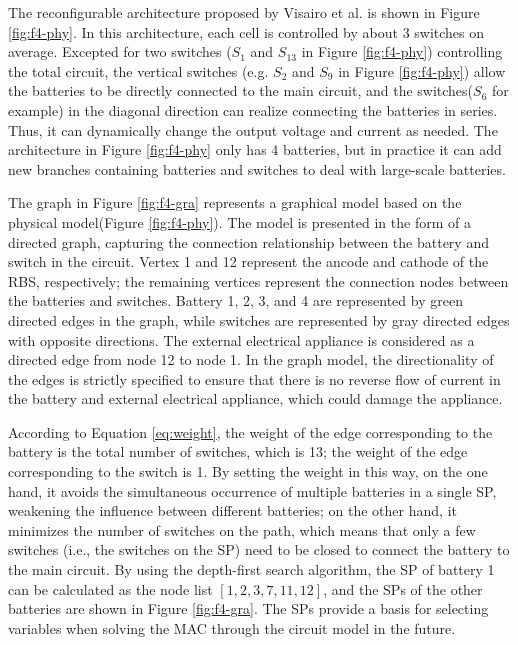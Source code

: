 \documentclass{article}
\begin{document}
The reconfigurable architecture proposed by Visairo et al.\cite{visairoReconfigurableBatteryPack2008} is shown in Figure \ref{fig:f4-phy}.
In this architecture, each cell is controlled by about 3 switches on average.
Excepted for two switches ($S_1$ and $S_{13}$ in Figure \ref{fig:f4-phy}) controlling the total circuit, the vertical switches (e.g. $S_2$ and $S_9$ in Figure \ref{fig:f4-phy}) allow the batteries to be directly connected to the main circuit, and the switches($S_6$ for example) in the diagonal direction can realize connecting the batteries in series.
Thus, it can dynamically change the output voltage and current as needed.
The architecture in Figure \ref{fig:f4-phy} only has 4 batteries, but in practice it can add new branches containing batteries and switches to deal with large-scale batteries\cite{kimDependableEfficientScalable2010}.


The graph in Figure \ref{fig:f4-gra} represents a graphical model based on the physical model(Figure \ref{fig:f4-phy}). 
The model is presented in the form of a directed graph, capturing the connection relationship between the battery and switch in the circuit. 
Vertex 1 and 12 represent the ancode and cathode of the RBS, respectively; 
the remaining vertices represent the connection nodes between the batteries and switches. 
Battery 1, 2, 3, and 4 are represented by green directed edges in the graph, while switches are represented by gray directed edges with opposite directions. 
The external electrical appliance is considered as a directed edge from node 12 to node 1. 
In the graph model, the directionality of the edges is strictly specified to ensure that there is no reverse flow of current in the battery and external electrical appliance, which could damage the appliance. 


According to Equation \ref{eq:weight}, the weight of the edge corresponding to the battery is the total number of switches, which is 13; 
the weight of the edge corresponding to the switch is 1. 
By setting the weight in this way, on the one hand, it avoids the simultaneous occurrence of multiple batteries in a single SP, weakening the influence between different batteries; 
on the other hand, it minimizes the number of switches on the path, which means that only a few switches (i.e., the switches on the SP) need to be closed to connect the battery to the main circuit. 
By using the depth-first search algorithm, the SP of battery 1 can be calculated as the node list $[1, 2, 3, 7, 11, 12]$, and the SPs of the other batteries are shown in Figure \ref{fig:f4-gra}. 
The SPs provide a basis for selecting variables when solving the MAC through the circuit model in the future.
\end{document}
